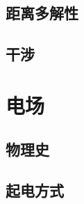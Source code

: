 \documentclass[cn,blue,11pt,normal]{elegantnote}
\begin{document}
\subsection{距离多解性}
\begin{proset}
	
\end{proset}
\begin{proset}
	
\end{proset}

\begin{proset}
	
\end{proset}
\subsection{干涉}
\begin{proset}
	
\end{proset}

\fi


\newpage
\section{电场}
\subsection{物理史}
\begin{proset}
	
\end{proset}

\subsection{起电方式}
\begin{proset}
	
\end{proset}
\end{document}
